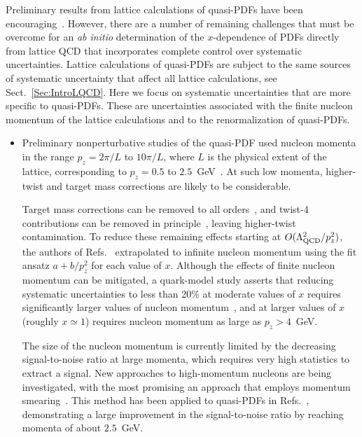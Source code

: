 Preliminary results from lattice calculations of quasi-PDFs have been 
encouraging~\cite{Lin:2014zya,Alexandrou:2015rja,Chen:2016utp,
Alexandrou:2016jqi}. 
%
However, there are a number of remaining challenges that must be overcome for 
an {\it ab initio} determination of the $x$-dependence of PDFs directly from 
lattice QCD that incorporates complete control over systematic uncertainties. 
%
Lattice calculations of quasi-PDFs are subject to the same sources of 
systematic uncertainty that affect all lattice calculations, see 
Sect.~\ref{Sec:IntroLQCD}. 
%
Here we focus on systematic uncertainties that are more specific to quasi-PDFs.
%
These are uncertainties associated with the finite nucleon momentum of the 
lattice calculations and to the renormalization of quasi-PDFs.

\begin{itemize}

\item Preliminary nonperturbative studies of the quasi-PDF used nucleon 
momenta in the range $p_z = 2\pi/L$ to $10\pi/L$, where $L$ is the physical 
extent of the lattice, corresponding to $p_z = 0.5$ to 
$2.5$~GeV~\cite{Lin:2014zya,Alexandrou:2015rja,Chen:2016utp,Alexandrou:2016jqi}.
%
At such low momenta, higher-twist and target mass corrections are likely to be 
considerable.

Target mass corrections can be removed to all orders~\cite{Chen:2016utp}, and 
twist-4 contributions can be removed in 
principle~\cite{Chen:2016utp,Radyushkin:2016hsy}, leaving higher-twist 
contamination. 
%
To reduce these remaining effects starting at $O(\Lambda_{\rm QCD}^2/p_z^2)$, 
the authors of Refs.~\cite{Lin:2014zya,Chen:2016utp} extrapolated to infinite 
nucleon momentum using the fit ansatz $a + b/p_z^2$ for each value of $x$. 
%
Although the effects of finite nucleon momentum can be mitigated, a quark-model 
study asserts that reducing systematic uncertainties to less than 20\% at 
moderate values of $x$ requires significantly larger values of nucleon 
momentum~\cite{Gamberg:2014zwa}, and at larger values of $x$ 
(roughly $x\simeq 1$) requires nucleon momentum as large as $p_z > 4$~GeV.

The size of the nucleon momentum is currently limited by the decreasing 
signal-to-noise ratio at large momenta, which requires very high statistics 
to extract a signal. 
%
New approaches to high-momentum nucleons are being investigated, with the most 
promising an approach that employs momentum smearing~\cite{Bali:2016lva}. 
%
This method has been applied to quasi-PDFs in 
Refs.~\cite{Alexandrou:2016jqi,Green:2017xeu}, demonstrating a large 
improvement in the signal-to-noise ratio by reaching momenta of about $2.5$~GeV.


\end{itemize}
